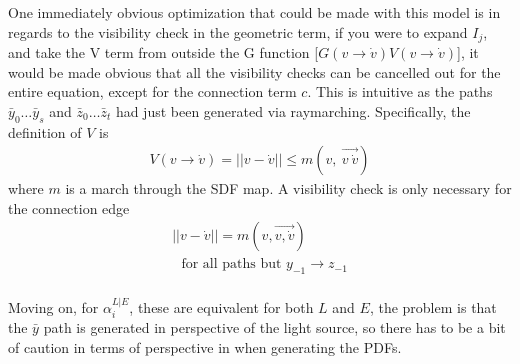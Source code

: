 \documentclass{article}
\begin{document}
    One immediately obvious optimization that could be made with this model is
    in regards to the visibility check in the geometric term, if you were to
    expand $I_j$, and take the V term from outside the G function
    [$G(v \rightarrow
    \dot{v}) V(v \rightarrow \dot{v})$],
    it would be made obvious that all the visibility checks can be
    cancelled out for the entire equation, except for the connection term $c$.
    This is intuitive as the paths
    $\bar{y}_{0} \ldots \bar{y}_s$ and $\bar{z}_0 \ldots \bar{z}_t$ had just been generated via raymarching.
    Specifically, the definition of $V$ is
  \begin{align}
    V(v \rightarrow \dot{v}) = ||v - \dot{v}|| \leq
    m(v,\:\overrightarrow{v\:\dot{v}})
  \end{align}
    where $m$ is a march through the SDF map. A visibility check is only
    necessary for the connection edge
    \begin{align*}
      ||v - \dot{v}|| = m(v, \overrightarrow{v, \dot{v}})\\
      \:\:\:\text{for all paths but } y_{-1} \rightarrow z_{-1} 
    \end{align*}
\\
    Moving on, for $\alpha^{L|E}_i$, these are equivalent for both $L$ and $E$,
    the problem is that the $\bar{y}$ path is generated in perspective of the
    light source, so there has to be a bit of caution in terms of perspective in when generating the PDFs.
    
\end{document}
